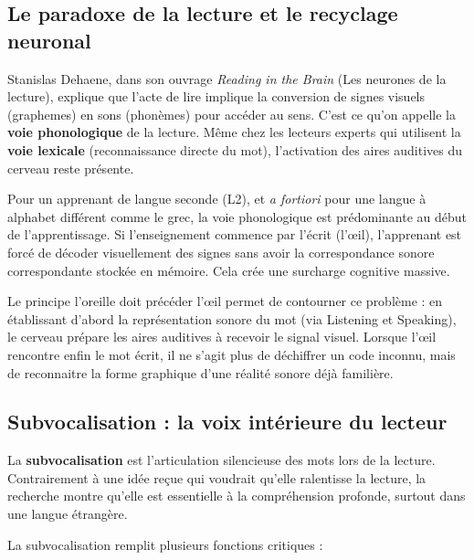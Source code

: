 \subsection{Le paradoxe de la lecture et le recyclage neuronal}

Stanislas Dehaene, dans son ouvrage \textit{Reading in the Brain} (Les neurones de la lecture),
explique que l'acte de lire implique la conversion de signes visuels (graphemes) en sons (phonèmes)
pour accéder au sens.\cite{III-2-1-ref22} C'est ce qu'on appelle la \textbf{voie phonologique} de la
lecture. Même chez les lecteurs experts qui utilisent la \textbf{voie lexicale} (reconnaissance
directe du mot), l'activation des aires auditives du cerveau reste présente.

Pour un apprenant de langue seconde (L2), et \textit{a fortiori} pour une langue à alphabet
différent comme le grec, la voie phonologique est prédominante au début de l'apprentissage. Si
l'enseignement commence par l'écrit (l'œil), l'apprenant est forcé de décoder visuellement des
signes sans avoir la correspondance sonore correspondante stockée en mémoire. Cela crée une
surcharge cognitive massive.\cite{III-2-1-ref28}

Le principe \og l'oreille doit précéder l'œil\fg{} permet de contourner ce problème : en établissant
d'abord la représentation sonore du mot (via Listening et Speaking), le cerveau prépare les aires
auditives à recevoir le signal visuel. Lorsque l'œil rencontre enfin le mot écrit, il ne s'agit plus
de déchiffrer un code inconnu, mais de reconnaitre la forme graphique d'une réalité sonore déjà
familière.\cite{III-2-1-ref30}



\subsection{Subvocalisation : la voix intérieure du lecteur}

La \textbf{subvocalisation} est l'articulation silencieuse des mots lors de la lecture.
Contrairement à une idée reçue qui voudrait qu'elle ralentisse la lecture, la recherche montre
qu'elle est essentielle à la compréhension profonde, surtout dans une langue
étrangère.\cite{III-2-1-ref31}

La subvocalisation remplit plusieurs fonctions critiques :

